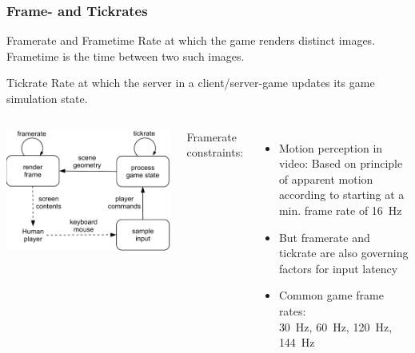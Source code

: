 \documentclass{UDEbeamerEN}
\begin{document}
\begin{frame}
	\frametitle{Frame- and Tickrates}

	\begin{block}{Framerate and Frametime}
		Rate at which the game renders distinct images. Frametime is the time between two such images.
	\end{block}

	\pause
	\begin{block}{Tickrate}
		Rate at which the server in a client/server-game updates its game simulation state.
	\end{block}


	\pause
	\begin{columns}[T]
			\begin{center}
				\includegraphics[width=0.7\columnwidth]{../../../models/game_loop.pdf}
			\end{center}

		\pause
			\vspace{-1mm}
			Framerate constraints:
			\vspace{-1mm}
			\begin{itemize}
				\item Motion perception in video: Based on principle of apparent motion according to \cite{wertheimer1912experimentelle}starting at a min. frame rate of \SI{16}{\hertz}
				\item But framerate and tickrate are also governing factors for input latency

				\item Common game frame rates:\\ \SI{30}{\hertz}, \SI{60}{\hertz}, \SI{120}{\hertz}, \SI{144}{\hertz}
			\end{itemize}
	\end{columns}

\end{frame}
\end{document}
